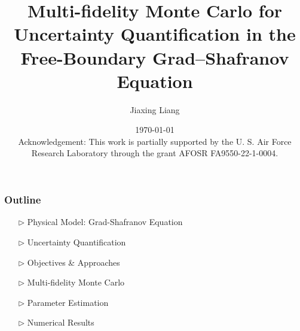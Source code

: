 \documentclass{beamer}
\title[MFMC for Tokamak UQ]{Multi-fidelity Monte Carlo for Uncertainty Quantification in the Free-Boundary Grad–Shafranov Equation}
\date{\today\\[2em]
{\footnotesize Acknowledgement: This work is partially supported by the U. S. Air Force Research Laboratory through the grant AFOSR FA9550-22-1-0004. }
}
\author[J.Liang]{\normalsize  Jiaxing Liang\\ }
\institute[Rice University]{\fontsize{8}{8} Department of Computational Applied Mathematics \& Operations Research, Rice University}
\begin{document}
\frame{\titlepage }

\begin{frame}[c]		
\frametitle{Outline}
\normalsize
\begin{itemize}[leftmargin=5pt] 
\item[$\triangleright$] Physical Model: Grad-Shafranov Equation
\vspace{0.3cm}
\item[$\triangleright$] Uncertainty Quantification 
\vspace{0.3cm}
\item[$\triangleright$] Objectives \& Approaches
\vspace{0.3cm}
\item[$\triangleright$] Multi-fidelity Monte Carlo
\vspace{0.3cm}
\item[$\triangleright$] Parameter Estimation
\vspace{0.3cm}
\item[$\triangleright$] Numerical Results
\end{itemize}
\end{frame}
\end{document}
